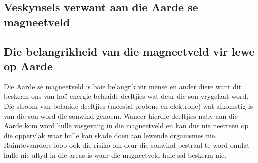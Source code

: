 
	



\subsection{Veskynsels verwant aan die Aarde se magneetveld}
            \nopagebreak
\label{m37830*fs-id7505799}

\subsection{Die belangrikheid van die magneetveld vir lewe op Aarde}
            \nopagebreak

Die Aarde se magneetveld is baie belangrik vir mense en ander diere want dit beskerm ons van ho\"e energie belaaide deeltjies wat deur die son vrygelaat word. Die stroom van belaaide deeltjies (meestal protone en elektrone) wat afkomstig is van die son word die sonwind genoem. Waneer hierdie deeltjies naby aan die Aarde kom word hulle vasgevang in die magneetveld en kan dus nie neerre\"en op die oppervlak waar hulle kan skade doen aan lewende organismes nie. Ruimtevaarders loop ook die risiko om deur die sonwind bestraal te word omdat hulle nie altyd in die areas is waar die magneetveld hule sal beskerm nie.\par

